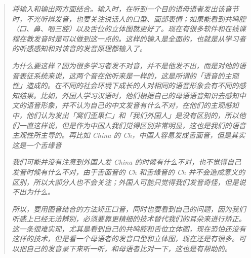 \documentclass[a4paper]{article}
\begin{document}
\begin{quote}
  \textit{将输入和输出两方面结合。输入时，在听到一个目的语母语者发出该音节时，不光听辨发音，也要关注说话人的口型、面部表情；如果能看到共鸣腔（口、鼻、咽三腔）以及舌位的立体图就更好了。现在有很多软件和在线课程在教发音时是可以做到这一点的。这样的输入是全面的，也就是从学习者的听感感知和对该音的发音原理都输入了。
  }
  \par
  \textit{为什么要这样？因为很多学习者发不对音，并不是他发不出，而是对他的语音表征系统来说，这两个音在他听来是一样的，这是所谓的「语音的主观性」造成的。在不同的社会环境下成长的人对相同的语音形象会有不同的感知结果。比如，外国人学习汉语时，他们根据自己的母语语音知识去感知中文的语音形象，并不认为自己的中文发音有什么不对，在他们的主观感知中，他们认为发出「窝们歪果仁」和「我们外国人」是没有区别的，所以他们一直这样说，但是作为中国人我们觉得区别非常明显，这也是我们的语音主观性所主导的。再比如 China 的 Ch，中国人容易发成舌面音，但是其实这是一个舌缘音
  }
  \par
  \textit{我们可能并没有注意到外国人发 China 的时候有什么不对，也不觉得自己发音时候有什么不对，由于舌面音的 Ch 和舌缘音的 Ch 并不会造成意义的区别，所以大部分人也不会关注；外国人可能只觉得我们发音奇怪，但是说不出为什么。
 }
 \par
 \textit{所以，要用图音结合的方法矫正口音，同时也要看到自己的问题，因为我们听感上已经无法辨别，必须要靠更精细的技术替代我们的耳朵来进行矫正。这一条很难实现，尤其是看到自己的共鸣腔和舌位立体图，现在恐怕还没有这样的技术，但是看一个母语者的发音口型和立体图，现在还是有很多。可以把自己的发音录下来听一听，和母语者比对一下，这也是有帮助的。}
\end{quote}
\end{document}

